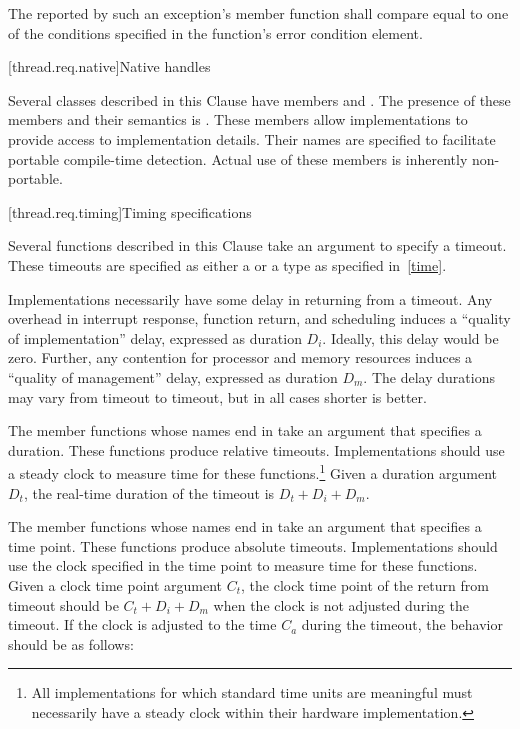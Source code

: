 \pnum
The  reported by such an exception's  member function
shall compare equal to one of the conditions specified in the function's error condition
element.

[thread.req.native]{Native handles}

\pnum
Several classes described in this Clause have members  and
. The presence of these members and their semantics is
.
\enternote These members allow implementations to provide access
to implementation details. Their names are specified to facilitate portable compile-time
detection. Actual use of these members is inherently non-portable. \exitnote

[thread.req.timing]{Timing specifications}

\pnum
Several functions described in this Clause take an argument to specify a timeout. These
timeouts are specified as either a  or a  type as
specified in~\ref{time}.

\pnum
Implementations necessarily have some delay in returning from a timeout. Any overhead in
interrupt response, function return, and scheduling induces a ``quality of implementation''
delay, expressed as duration $D_i$. Ideally, this delay would be zero. Further, any contention for
processor and memory resources induces a ``quality of management'' delay, expressed as duration
$D_m$. The delay durations may vary from timeout to timeout, but in all cases shorter is better.

\pnum
The member functions whose names end in  take an argument that
specifies a duration. These functions produce relative timeouts. Implementations
should use a steady clock to measure time for these functions.\footnote{All
implementations for which standard time units are meaningful must necessarily
have a steady clock within their hardware implementation.} Given a duration
argument $D_t$, the real-time duration of the timeout is $D_t + D_i + D_m$.

\pnum
The member functions whose names end in  take an argument that specifies a time
point. These functions produce absolute timeouts. Implementations should use the clock
specified in the time point to measure time for these functions. Given a clock time point
argument $C_t$, the clock time point of the return from timeout should be $C_t + D_i + D_m$
when the clock is not adjusted during the timeout. If the clock is adjusted to the time $C_a$
during the timeout, the behavior should be as follows:

